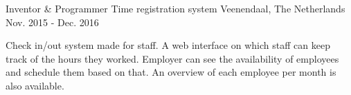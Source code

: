 


\begin{cventries}


\cventry
{Inventor \& Programmer} %
{Time registration system} %
{Veenendaal, The Netherlands} %
{Nov. 2015 - Dec. 2016} %
{ %
\begin{cvitems}
\item {Check in/out system made for staff. A web interface on which staff can keep track of the hours they worked. Employer can see the availability of employees and schedule them based on that. An overview of each employee per month is also available.}
\end{cvitems}
}


\end{cventries}
